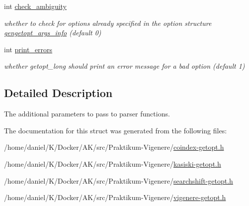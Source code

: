 \begin{DoxyCompactItemize}
\mbox{\label{structcmdline__parser__params_a6e4442704fc40b0b655f7cc602f13ec4}} 
int \hyperlink{structcmdline__parser__params_a6e4442704fc40b0b655f7cc602f13ec4}{check\+\_\+ambiguity}
\begin{DoxyCompactList}\small\item\em whether to check for options already specified in the option structure \hyperlink{structgengetopt__args__info}{gengetopt\+\_\+args\+\_\+info} (default 0) \end{DoxyCompactList}\item 
\mbox{\label{structcmdline__parser__params_a3236f066777488e8502abe05ccd24455}} 
int \hyperlink{structcmdline__parser__params_a3236f066777488e8502abe05ccd24455}{print\+\_\+errors}
\begin{DoxyCompactList}\small\item\em whether getopt\+\_\+long should print an error message for a bad option (default 1) \end{DoxyCompactList}\end{DoxyCompactItemize}


\subsection{Detailed Description}
The additional parameters to pass to parser functions. 

The documentation for this struct was generated from the following files\+:\begin{DoxyCompactItemize}
\item 
/home/daniel/\+K/\+Docker/\+A\+K/src/\+Praktikum-\/\+Vigenere/\hyperlink{coindex-getopt_8h}{coindex-\/getopt.\+h}\item 
/home/daniel/\+K/\+Docker/\+A\+K/src/\+Praktikum-\/\+Vigenere/\hyperlink{kasiski-getopt_8h}{kasiski-\/getopt.\+h}\item 
/home/daniel/\+K/\+Docker/\+A\+K/src/\+Praktikum-\/\+Vigenere/\hyperlink{searchshift-getopt_8h}{searchshift-\/getopt.\+h}\item 
/home/daniel/\+K/\+Docker/\+A\+K/src/\+Praktikum-\/\+Vigenere/\hyperlink{vigenere-getopt_8h}{vigenere-\/getopt.\+h}\end{DoxyCompactItemize}
